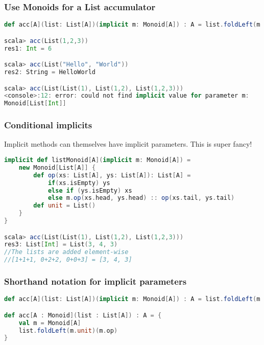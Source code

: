 \hypertarget{use-monoids-for-a-list-accumulator}{%
\subsubsection{Use Monoids for a List
accumulator}\label{use-monoids-for-a-list-accumulator}}

\begin{lstlisting}[language=scala,mathescape=false]
def acc[A](list: List[A])(implicit m: Monoid[A]) : A = list.foldLeft(m.unit)(m.op)

scala> acc(List(1,2,3))
res1: Int = 6

scala> acc(List("Hello", "World"))
res2: String = HelloWorld

scala> acc(List(List(1), List(1,2), List(1,2,3)))
<console>:12: error: could not find implicit value for parameter m:
Monoid[List[Int]]
\end{lstlisting}

\hypertarget{conditional-implicits}{%
\subsubsection{Conditional implicits}\label{conditional-implicits}}

Implicit methods can themselves have implicit parameters. This is super
fancy!

\begin{lstlisting}[language=scala,mathescape=false]
implicit def listMonoid[A](implicit m: Monoid[A]) =
    new Monoid[List[A]] {
        def op(xs: List[A], ys: List[A]): List[A] =
            if(xs.isEmpty) ys
            else if (ys.isEmpty) xs
            else m.op(xs.head, ys.head) :: op(xs.tail, ys.tail)
        def unit = List()
    }
}

scala> acc(List(List(1), List(1,2), List(1,2,3)))
res3: List[Int] = List(3, 4, 3)
//The lists are added element-wise
//[1+1+1, 0+2+2, 0+0+3] = [3, 4, 3]
\end{lstlisting}

\clearpage
\hypertarget{shorthand-notation-for-implicit-parameters}{%
\subsubsection{Shorthand notation for implicit
parameters}\label{shorthand-notation-for-implicit-parameters}}

\begin{lstlisting}[language=scala,mathescape=false]
def acc[A](list: List[A])(implicit m: Monoid[A]) : A = list.foldLeft(m.unit)(m.op)

def acc[A : Monoid](list : List[A]) : A = {
    val m = Monoid[A]
    list.foldLeft(m.unit)(m.op)
}
\end{lstlisting}

